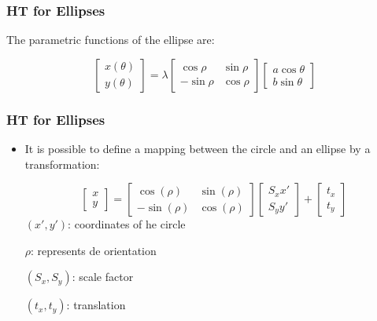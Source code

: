 \documentclass{beamer}
\begin{document}
\begin{frame}
  \frametitle{HT for Ellipses}

The parametric functions of the ellipse are:

$$\begin{bmatrix}x(\theta) \\ y(\theta) \end{bmatrix} = \lambda \begin{bmatrix} \cos \rho & \sin \rho \\ -\sin \rho &\cos \rho \end{bmatrix} \begin{bmatrix} a \cos \theta \\ b \sin \theta \end{bmatrix}$$

\end{frame}



\begin{frame}
  \frametitle{HT for Ellipses}
  \begin{itemize}
  \item It is possible to define a mapping between the circle and an
  ellipse by a transformation:

  \begin{equation}
    \begin{bmatrix} x \\ y\end{bmatrix} = \begin{bmatrix} \cos(\rho) &\sin(\rho) \\ -\sin(\rho) & \cos(\rho) \end{bmatrix} \begin{bmatrix} S_{x} x' \\ S_{y}y'\end{bmatrix} + \begin{bmatrix} t_{x} \\ t_{y}\end{bmatrix}
        \label{eq:ellipse}
  \end{equation}
  $(x',y')$: coordinates of he circle

  $\rho$: represents de orientation

  $(S_{x},S_{y})$: scale factor

  $(t_{x},t_{y})$: translation
  \end{itemize}
\end{frame}
\end{document}
